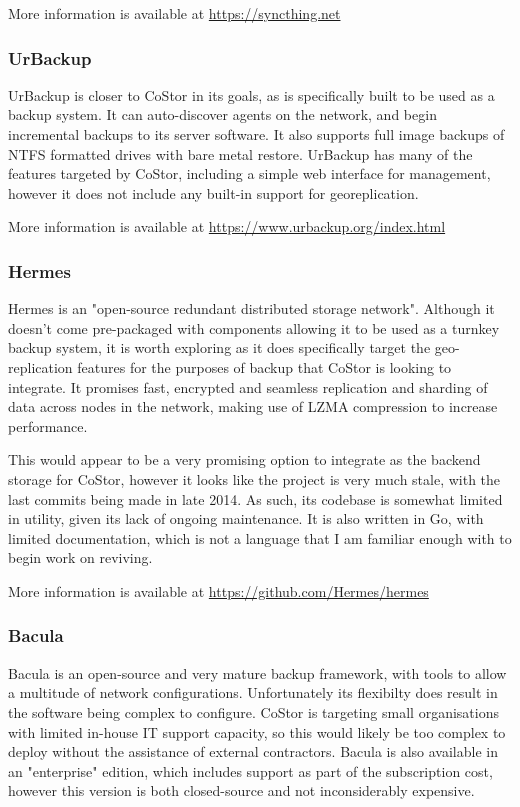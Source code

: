 \documentclass[bsc,frontabs,twoside,singlespacing,parskip,deptreport]{infthesis}     %
\begin{document}
More information is available at \url{https://syncthing.net} \cite{syncthing}

\subsubsection{UrBackup}

UrBackup is closer to CoStor in its goals, as is specifically built to be used as a backup 
system. It can auto-discover agents on the network, and begin incremental backups to its server
software. It also supports full image backups of NTFS formatted drives with bare metal 
restore. UrBackup has many of the features targeted by CoStor, including a simple web interface
for management, however it does not include any built-in support for georeplication.

More information is available at \url{https://www.urbackup.org/index.html} \cite{urbackup}

\subsubsection{Hermes}

Hermes is an "open-source redundant distributed storage network"\cite{hermes}. Although it
doesn't come pre-packaged with components allowing it to be used as a turnkey backup system,
it is worth exploring as it does specifically target the geo-replication features for the 
purposes of backup that CoStor is looking to integrate. It promises fast, encrypted and seamless
replication and sharding of data across nodes in the network, making use of LZMA compression
to increase performance.

This would appear to be a very promising option to integrate as the backend storage for CoStor,
however it looks like the project is very much stale, with the last commits being made in late 
2014. As such, its codebase is somewhat limited in utility, given its lack of ongoing 
maintenance. It is also written in Go, with limited documentation, which is not a language
that I am familiar enough with to begin work on reviving.

More information is available at \url{https://github.com/Hermes/hermes} \cite{hermes}

\subsubsection{Bacula}

Bacula is an open-source and very mature backup framework, with tools to allow a multitude of
network configurations. Unfortunately its flexibilty does result in the software being complex
to configure. CoStor is targeting small organisations with limited in-house IT support capacity,
so this would likely be too complex to deploy without the assistance of external contractors. 
Bacula is also available in an "enterprise" edition\cite{bacula-ent}, which includes 
support as part of the subscription cost, however this version is both closed-source and
not inconsiderably expensive.
\end{document}
